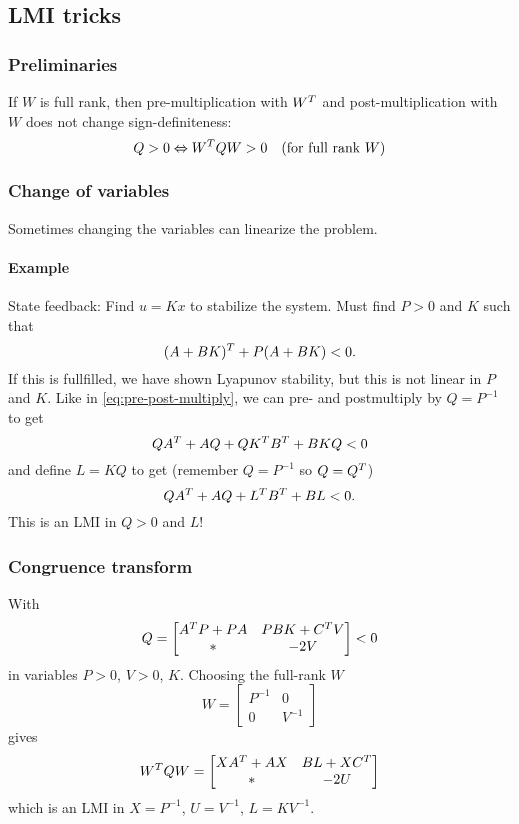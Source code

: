 \subsection{LMI tricks}
\subsubsection{Preliminaries}
If $W$ is full rank, then pre-multiplication with $W^{T}$ and post-multiplication with $W$ does not change sign-definiteness:
\begin{equation}\label{eq:pre-post-multiply}
  Q > 0 \Leftrightarrow W^{T} Q W > 0 \quad (\mbox{for full rank } W)
\end{equation}

\subsubsection{Change of variables}
Sometimes changing the variables can linearize the problem.
\paragraph{Example} State feedback: Find $u = Kx$ to stabilize the system. Must find $P > 0$ and $K$ such that
\begin{equation}
  (A + BK)^{T} + P(A + BK) < 0.
\end{equation}
If this is fullfilled, we have shown Lyapunov stability, but this is not linear in $P$ and $K$. Like in \eqref{eq:pre-post-multiply}, we can pre- and postmultiply by $Q = P^{-1}$ to get
\begin{equation}
  QA^{T} + AQ + QK^{T} B^{T} + BKQ < 0
\end{equation}
and define $L = KQ$ to get (remember $Q = P^{-1}$ so $Q = Q^{T}$)
\begin{equation}
  QA^{T} + AQ + L^{T} B^{T} + BL < 0.
\end{equation}
This is an LMI in $Q > 0$ and $L$!

\subsubsection{Congruence transform}
With
\begin{equation}
  Q =
  \begin{bmatrix}
    A^{T} P + PA & PBK + C^{T} V \\
    * & -2V
  \end{bmatrix}
  < 0
\end{equation}
in variables $P>0$, $V>0$, $K$. Choosing the full-rank $W$
\begin{equation}
  W =
  \begin{bmatrix}
    P^{-1} & 0 \\
    0 & V^{-1}
  \end{bmatrix}
\end{equation}
gives
\begin{equation}
  W^{T} Q W =
  \begin{bmatrix}
    XA^{T} + AX & BL + XC^{T} \\
    * & -2U
  \end{bmatrix}
\end{equation}
which is an LMI in $X = P^{-1}$, $U = V^{-1}$, $L = KV^{-1}$.

